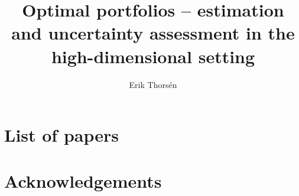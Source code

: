 \documentclass[12pt, twoside]{book}\usepackage{knitr}
\title{Optimal portfolios -- estimation and uncertainty assessment in the high-dimensional setting}
\author{Erik Thorsén}
\date{}
\makeatletter
\newcommand{\email}{erik.thorsen$@$math.su.se}
\newcommand{\auth}{Erik Thorsén}
\newcommand{\yr}{2022}
\newcommand{\address}{Matematiska Institutionen, Stockholms Universitet, 106 91 Stockholm}
\makeatother
\begin{document}
\frontmatterSU
% 
% 
% 
% 
% 
% 
% 
% 
%  
% 
% 
% 
% 
\chapter*{List of papers}


\chapter*{Acknowledgements}

\end{document}
